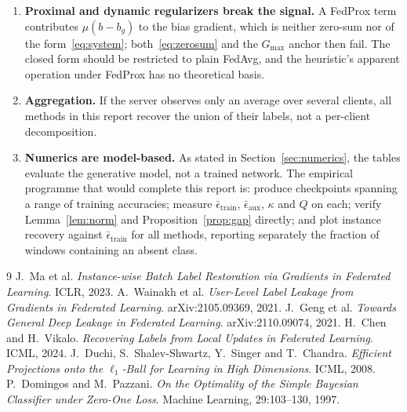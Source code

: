 \documentclass[11pt]{article}
\theoremstyle{remark}
\begin{document}
\begin{enumerate}
\item \textbf{Proximal and dynamic regularizers break the signal.} A FedProx
  term contributes $\mu(b-b_g)$ to the bias gradient, which is neither
  zero-sum nor of the form~\eqref{eq:system}; both~\eqref{eq:zerosum} and the
  $G_{\max}$ anchor then fail. The closed form should be restricted to plain
  FedAvg, and the heuristic's apparent operation under FedProx has no
  theoretical basis.

\item \textbf{Aggregation.} If the server observes only an average over
  several clients, all methods in this report recover the union of their
  labels, not a per-client decomposition.

\item \textbf{Numerics are model-based.} As stated in
  Section~\ref{sec:numerics}, the tables evaluate the generative model, not a
  trained network. The empirical programme that would complete this report
  is: produce checkpoints spanning a range of training accuracies; measure
  $\bar\epsilon_{\mathrm{train}}$, $\bar\epsilon_{\mathrm{aux}}$, $\kappa$
  and $Q$ on each; verify Lemma~\ref{lem:norm} and
  Proposition~\ref{prop:gap} directly; and plot instance recovery against
  $\bar\epsilon_{\mathrm{train}}$ for all methods, reporting separately the
  fraction of windows containing an absent class.
\end{enumerate}

\begin{thebibliography}{9}
 J.~Ma et al.
  \emph{Instance-wise Batch Label Restoration via Gradients in Federated
  Learning}. ICLR, 2023.
 A.~Wainakh et al.
  \emph{User-Level Label Leakage from Gradients in Federated Learning}.
  arXiv:2105.09369, 2021.
 J.~Geng et al.
  \emph{Towards General Deep Leakage in Federated Learning}.
  arXiv:2110.09074, 2021.
 H.~Chen and H.~Vikalo.
  \emph{Recovering Labels from Local Updates in Federated Learning}.
  ICML, 2024.
 J.~Duchi, S.~Shalev-Shwartz, Y.~Singer and T.~Chandra.
  \emph{Efficient Projections onto the $\ell_1$-Ball for Learning in High
  Dimensions}. ICML, 2008.
 P.~Domingos and M.~Pazzani.
  \emph{On the Optimality of the Simple Bayesian Classifier under Zero-One
  Loss}. Machine Learning, 29:103--130, 1997.
\end{thebibliography}
\end{document}
